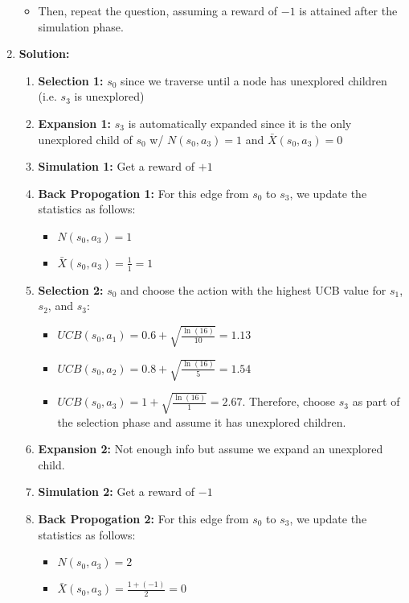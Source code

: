\begin{example}
\begin{enumerate}
\begin{itemize}
            \item Then, repeat the question, assuming a reward of $-1$ is attained after the simulation phase.
        \end{itemize}
        \item \textbf{Solution:}
        \begin{enumerate}
            \item \textbf{Selection 1:} $s_0$ since we traverse until a node has unexplored children (i.e. $s_3$ is unexplored)
            \item \textbf{Expansion 1:} $s_3$ is automatically expanded since it is the only unexplored child of $s_0$ w/ $N(s_0, a_3) = 1$ and $\bar{X}(s_0, a_3) = 0$
            \item \textbf{Simulation 1:} Get a reward of $+1$ 
            \item \textbf{Back Propogation 1:} For this edge from $s_0$ to $s_3$, we update the statistics as follows:
            \begin{itemize}
                \item $N(s_0, a_3) = 1$
                \item $\bar{X}(s_0, a_3) = \frac{1}{1} = 1$
            \end{itemize}
            \item \textbf{Selection 2:} $s_0$ and choose the action with the highest UCB value for $s_1$, $s_2$, and $s_3$:
            \begin{itemize}
                \item $UCB(s_0, a_1) = 0.6 + \sqrt{\frac{\ln(16)}{10}} = 1.13$ 
                \item $UCB(s_0, a_2) = 0.8 + \sqrt{\frac{\ln(16)}{5}} = 1.54$ 
                \item $UCB(s_0, a_3) = 1 + \sqrt{\frac{\ln(16)}{1}} = 2.67$. Therefore, choose $s_3$ as part of the selection phase and assume it has unexplored children.
            \end{itemize}
            \item \textbf{Expansion 2:} Not enough info but assume we expand an unexplored child. 
            \item \textbf{Simulation 2:} Get a reward of $-1$
            \item \textbf{Back Propogation 2:} For this edge from $s_0$ to $s_3$, we update the statistics as follows:
            \begin{itemize}
                \item $N(s_0, a_3) = 2$
                \item $\bar{X}(s_0, a_3) = \frac{1 + (-1)}{2} = 0$
            \end{itemize}
        \end{enumerate}
    \end{enumerate}
\end{example}
\newpage

